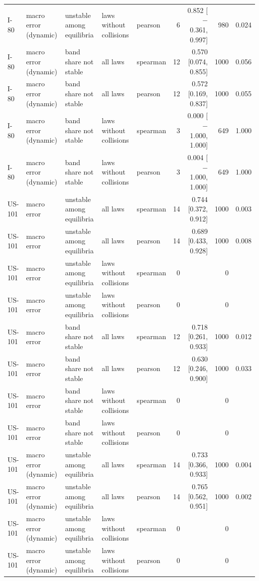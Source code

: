 \begin{table}[htbp]
{\begin{tabular}{lllllrrrr}
I-80 & macro error (dynamic) & unstable among equilibria & laws without collisions & pearson & 6 & 0.852 [$-$0.361, 0.997] & 980 & 0.024 \\
I-80 & macro error (dynamic) & band share not stable & all laws & spearman & 12 & 0.570 [0.074, 0.855] & 1000 & 0.056 \\
I-80 & macro error (dynamic) & band share not stable & all laws & pearson & 12 & 0.572 [0.169, 0.837] & 1000 & 0.055 \\
I-80 & macro error (dynamic) & band share not stable & laws without collisions & spearman & 3 & 0.000 [$-$1.000, 1.000] & 649 & 1.000 \\
I-80 & macro error (dynamic) & band share not stable & laws without collisions & pearson & 3 & 0.004 [$-$1.000, 1.000] & 649 & 1.000 \\
US-101 & macro error & unstable among equilibria & all laws & spearman & 14 & 0.744 [0.372, 0.912] & 1000 & 0.003 \\
US-101 & macro error & unstable among equilibria & all laws & pearson & 14 & 0.689 [0.433, 0.928] & 1000 & 0.008 \\
US-101 & macro error & unstable among equilibria & laws without collisions & spearman & 0 &  & 0 &  \\
US-101 & macro error & unstable among equilibria & laws without collisions & pearson & 0 &  & 0 &  \\
US-101 & macro error & band share not stable & all laws & spearman & 12 & 0.718 [0.261, 0.933] & 1000 & 0.012 \\
US-101 & macro error & band share not stable & all laws & pearson & 12 & 0.630 [0.246, 0.900] & 1000 & 0.033 \\
US-101 & macro error & band share not stable & laws without collisions & spearman & 0 &  & 0 &  \\
US-101 & macro error & band share not stable & laws without collisions & pearson & 0 &  & 0 &  \\
US-101 & macro error (dynamic) & unstable among equilibria & all laws & spearman & 14 & 0.733 [0.366, 0.933] & 1000 & 0.004 \\
US-101 & macro error (dynamic) & unstable among equilibria & all laws & pearson & 14 & 0.765 [0.562, 0.951] & 1000 & 0.002 \\
US-101 & macro error (dynamic) & unstable among equilibria & laws without collisions & spearman & 0 &  & 0 &  \\
US-101 & macro error (dynamic) & unstable among equilibria & laws without collisions & pearson & 0 &  & 0 &  \\

\end{tabular}}
\end{table}
